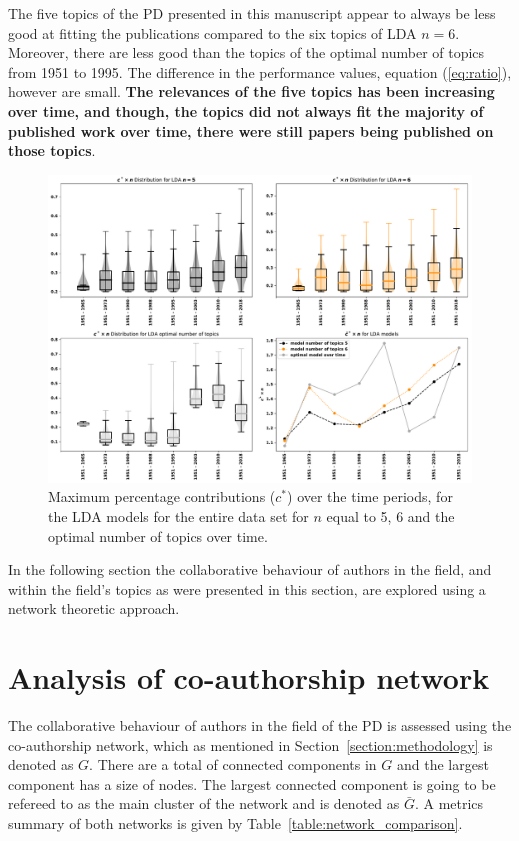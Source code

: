 \documentclass{article}
\theoremstyle{definition}
\newcommand{\connectedcomponents}{}
\newcommand{\largestcc}{}
\begin{document}
The five topics of the PD presented in this manuscript appear to always be
less good at fitting the publications compared to the six topics of LDA \(n=6\).
Moreover, there are less good than the topics of the optimal number of topics
from 1951 to 1995. The difference in the performance values, equation (\ref{eq:ratio}),
however are small. \textbf{The relevances of the five topics has been increasing
over time, and though, the topics did not always fit the majority of published
work over time, there were still papers being published on those topics}.

\begin{figure}[!hbtp]
    \centering
    \includegraphics[width=.75\textwidth]{./assets/images/contribution_over_time.pdf}
    \caption{Maximum percentage contributions (\(c^*\)) over the time periods,
    for the LDA models for the entire data set for \(n\) equal to 5, 6
    and the optimal number of topics over time.}
    \label{fig:median_percentage_contribution_over_time}
\end{figure}

In the following section the collaborative behaviour of authors in the field,
and within the field's topics as were presented in this section, are explored
using a network theoretic approach.

\section{Analysis of co-authorship network}\label{section:co_authorship}

The collaborative behaviour of authors in the field of the PD is assessed using
the co-authorship network, which as mentioned in
Section~\ref{section:methodology} is denoted as \(G\). There are a total of
\connectedcomponents connected components in \(G\) and the largest component has
a size of \largestcc nodes. The largest connected component is going to be
refereed to as the main cluster of the network and is denoted as \(\bar{G}\). A
metrics summary of both networks is given
by Table~\ref{table:network_comparison}.
\end{document}
